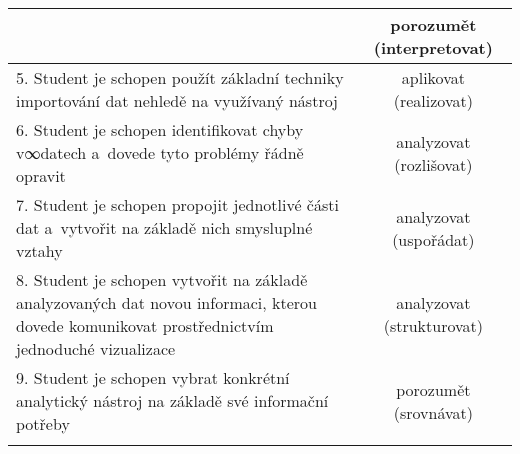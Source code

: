 \begin{table}[htbp]
{\begin{tabularx}{\linewidth}{p{9cm}c}
&

porozumět (interpretovat)

\\

\midrule

5. Student je schopen použít základní techniky importování dat nehledě na využívaný nástroj\label{5-cil}

&

aplikovat (realizovat)

\\

\midrule

6. Student je schopen identifikovat chyby v∞datech a~dovede tyto problémy řádně opravit\label{6-cil}

&

analyzovat (rozlišovat)

\\

\midrule

7. Student je schopen propojit jednotlivé části dat a~vytvořit na základě nich smysluplné vztahy\label{7-cil}

&

analyzovat (uspořádat)

\\

\midrule

8. Student je schopen vytvořit na základě analyzovaných dat novou informaci, kterou dovede komunikovat prostřednictvím jednoduché vizualizace\label{8-cil}

&

analyzovat (strukturovat)

\\

\midrule

9. Student je schopen vybrat konkrétní analytický nástroj na základě své informační potřeby\label{9-cil}

&

porozumět (srovnávat)

\\

\tabularnewline
\bottomrule
\end{tabularx}

}

\end{table}
